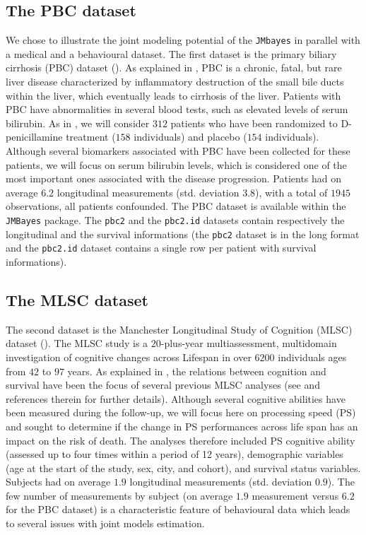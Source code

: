 \documentclass[12pt]{article}
\begin{document}
\subsection{The PBC dataset}
We chose to illustrate the joint modeling potential of the \texttt{JMbayes} in parallel with a medical and a behavioural dataset. The first dataset is the primary biliary cirrhosis (PBC) dataset (\cite{murtaugh1994primary}). As explained in \cite{JMbayes}, PBC is a chronic, fatal, but rare liver disease characterized by inflammatory destruction of the small bile ducts within the liver, which eventually leads to cirrhosis of the liver. Patients with PBC have abnormalities in several blood tests, such as elevated levels of serum bilirubin. As in \cite{JMbayes}, we will consider $312$ patients who have been randomized to D-penicillamine treatment ($158$ individuals) and placebo ($154$ individuals). Although several biomarkers associated with PBC have been collected for these patients, we will focus on serum bilirubin levels, which is considered one of the most important ones associated with the disease progression. Patients had on average $6.2$ longitudinal measurements (std. deviation $3.8$), with a total of $1945$ observations, all patients confounded. The PBC dataset is available within the \texttt{JMBayes} package. The \texttt{pbc2} and the \texttt{pbc2.id} datasets contain respectively the longitudinal and the survival informations (the \texttt{pbc2} dataset is in the long format and the \texttt{pbc2.id} dataset contains a single row per patient with survival informations).

\subsection{The MLSC dataset}

The second dataset is the Manchester Longitudinal Study of Cognition (MLSC) dataset (\cite{Rabbitt2004}). The MLSC study is a $20$-plus-year multiassessment, multidomain investigation of cognitive changes across Lifespan in over $6200$ individuals ages from $42$ to $97$ years. As explained in \cite{aichele2015life}, the relations between cognition and survival have been the focus of several previous MLSC analyses (see \cite{aichele2015life} and references therein for further details). Although several cognitive abilities have been measured during the follow-up, we will focus here on processing speed (PS) and sought to determine if the change in PS performances across life span has an impact on the risk of death. The analyses therefore included PS cognitive ability (assessed up to four times within a period of 12 years), demographic variables (age at the start of the study, sex, city, and cohort), and survival status variables. Subjects had on average $1.9$ longitudinal measurements (std. deviation $0.9$). The few number of measurements by subject (on average $1.9$ measurement versus $6.2$ for the PBC dataset) is a characteristic feature of behavioural data which leads to several issues with joint models estimation.
\end{document}
